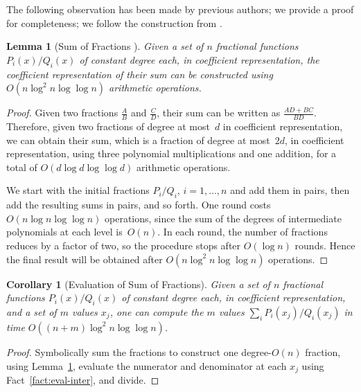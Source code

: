 \documentclass[11pt]{article}
\newtheorem{corollary}[theorem]{Corollary}
\newtheorem{lemma}[theorem]{Lemma}
\theoremstyle{remark}
\begin{document}
The following observation has been made by previous authors; we provide a
proof for completeness; we follow the construction from
\cite{ma-cdplbf-12,ma-cdplbf-16}. 


\begin{lemma}[Sum of Fractions \cite{ma-cdplbf-12,ma-cdplbf-16}]
  \label{lemma:sum-fractions}
  Given a set of $n$ fractional functions $P_i(x)/Q_i(x)$ of constant
  degree each, in coefficient representation, the coefficient
  representation of their sum can be constructed using $O(n \log^2 n
  \log \log n)$ arithmetic operations.
\end{lemma}

\begin{proof}
  Given two fractions $\frac A B$ and $\frac C D$, their sum can be
  written as $\frac{AD+BC}{BD}$.  Therefore, given two fractions of
  degree at most~$d$ in coefficient representation, we can obtain their sum,
  which is a fraction of degree at most~$2d$, in coefficient
  representation, using three polynomial multiplications and one
  addition, for a total of $O(d \log d \log \log d)$ arithmetic
  operations.


  We start with the initial fractions $P_i/Q_i$, $i=1,\dots,n$ and add
  them in pairs, then add the resulting sums in pairs, and so forth.
  One round costs $O(n \log n \log \log n)$ operations, since the sum
  of the degrees of intermediate polynomials at each level is~$O(n)$.
  In each round, the number of fractions reduces by a factor of two,
  so the procedure stops after $O(\log n)$ rounds.  Hence the final
  result will be obtained after $O(n \log^2 n \log \log n)$
  operations.
\end{proof}

\begin{corollary}[Evaluation of Sum of Fractions]
  \label{cor:eval-sum-fractions}
  Given a set of $n$ fractional functions $P_i(x)/Q_i(x)$ of constant
  degree each, in coefficient representation, and a set of $m$ values
  $x_j$, one can compute the $m$ values $\sum_i P_i(x_j)/Q_i(x_j)$ in 
  time $O((n + m) \log^2 n \log \log n)$.
\end{corollary}

\begin{proof}
  Symbolically sum the fractions to construct one degree-$O(n)$
  fraction, using Lemma~\ref{lemma:sum-fractions}, evaluate the
  numerator and denominator at each $x_j$ using
  Fact~\ref{fact:eval-inter}, and divide.
\end{proof}
\end{document}
